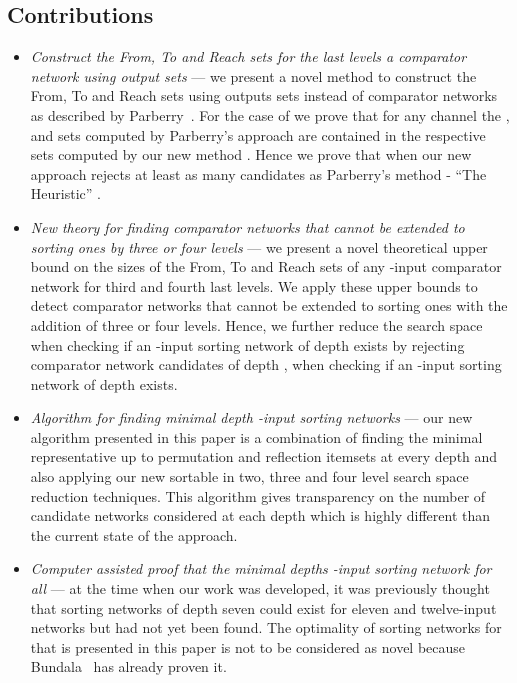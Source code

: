 \documentclass[13pt,a4paper]{article}
\begin{document}
\subsection{Contributions}

\begin{itemize}
	\item \emph{Construct the From, To and Reach sets for the last  levels a comparator network using output sets} --- we present a novel method to construct the From, To and Reach sets using outputs sets instead of comparator networks as described by Parberry~\cite{Parberry89}. For the case of  we prove that for any channel  the ,  and  sets computed by Parberry's approach are contained in the respective sets computed by our new method . Hence we prove that when  our new approach rejects at least as many candidates as Parberry's method - ``The Heuristic'' \cite{Parberry89}. 
	
	\item \emph{New theory for finding comparator networks that cannot be extended to sorting ones by three or four levels} --- we present a novel theoretical upper bound on the sizes of the From, To and Reach sets of any -input comparator network for third and fourth last levels. We apply these upper bounds to detect comparator networks that cannot be extended to sorting ones with the addition of three or four levels. Hence, we further reduce the search space when checking if an -input sorting network of depth  exists by rejecting comparator network candidates of depth ,  when checking if an -input sorting network of depth  exists.
	
	\item \emph{Algorithm for finding minimal depth -input sorting networks } --- our new algorithm presented in this paper is a combination of finding the minimal representative up to permutation and reflection itemsets at every depth and also applying our new sortable in two, three and four level search space reduction techniques. This algorithm gives transparency on the number of candidate networks considered at each depth which is highly different than the current state of the approach.
	
	\item \emph{Computer assisted proof that the minimal depths -input sorting network for all } --- at the time when our work was developed, it was previously thought that sorting networks of depth seven could exist for eleven and twelve-input networks but had not yet been found. The optimality of sorting networks for  that is presented in this paper is not to be considered as novel because Bundala~\cite{BundalaCCSZ14_Optimal_Depth} has already proven it.
\end{itemize}
\end{document}
